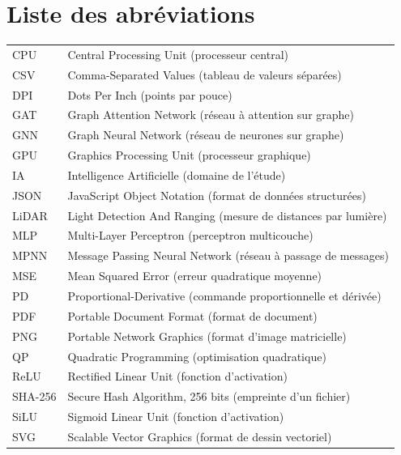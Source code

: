 \chapter*{Liste des abréviations}

\noindent\begin{tabularx}{\textwidth}{lX}
CPU & Central Processing Unit (processeur central)\\[3pt]
CSV & Comma-Separated Values (tableau de valeurs séparées)\\[3pt]
DPI & Dots Per Inch (points par pouce)\\[3pt]
GAT & Graph Attention Network (réseau à attention sur graphe)\\[3pt]
GNN & Graph Neural Network (réseau de neurones sur graphe)\\[3pt]
GPU & Graphics Processing Unit (processeur graphique)\\[3pt]
IA & Intelligence Artificielle (domaine de l’étude)\\[3pt]
JSON & JavaScript Object Notation (format de données structurées)\\[3pt]
LiDAR & Light Detection And Ranging (mesure de distances par lumière)\\[3pt]
MLP & Multi-Layer Perceptron (perceptron multicouche)\\[3pt]
MPNN & Message Passing Neural Network (réseau à passage de messages)\\[3pt]
MSE & Mean Squared Error (erreur quadratique moyenne)\\[3pt]
PD & Proportional-Derivative (commande proportionnelle et dérivée)\\[3pt]
PDF & Portable Document Format (format de document)\\[3pt]
PNG & Portable Network Graphics (format d’image matricielle)\\[3pt]
QP & Quadratic Programming (optimisation quadratique)\\[3pt]
ReLU & Rectified Linear Unit (fonction d’activation)\\[3pt]
SHA-256 & Secure Hash Algorithm, 256 bits (empreinte d’un fichier)\\[3pt]
SiLU & Sigmoid Linear Unit (fonction d’activation)\\[3pt]
SVG & Scalable Vector Graphics (format de dessin vectoriel)\\[3pt]
\end{tabularx}
